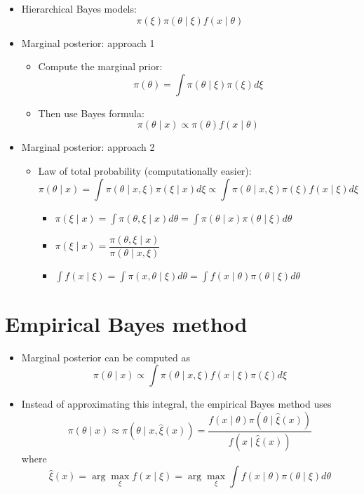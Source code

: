\documentclass[a4paper]{article}
\begin{document}
\begin{itemize}
    \item Hierarchical Bayes models:
    \[\pi(\xi)\pi(\theta\mid\xi)f(x\mid\theta) \]
    \item Marginal posterior: approach 1
    \begin{itemize}
        \item Compute the marginal prior:
        \[\pi(\theta)=\int\pi(\theta\mid\xi)\pi(\xi)d\xi \]
        \item Then use Bayes formula:
        \[\pi(\theta\mid x)\propto\pi(\theta)f(x\mid\theta) \]
    \end{itemize}
    \item Marginal posterior: approach 2
    \begin{itemize}
        \item Law of total probability (computationally easier):
        \[\pi(\theta\mid x)=\int\pi(\theta\mid x,\xi)\pi(\xi\mid x)d\xi\propto\int\pi(\theta\mid x,\xi)\pi(\xi)f(x\mid\xi)d\xi \]
        \begin{itemize}
            \item $\pi(\xi\mid x)=\int \pi(\theta,\xi\mid x)d\theta=\int\pi(\theta\mid x)\pi(\theta\mid\xi)d\theta$
            \item $\pi(\xi\mid x)=\dfrac{\pi(\theta,\xi\mid x)}{\pi(\theta\mid x,\xi)}$
            \item $\int f(x\mid\xi)=\int \pi(x,\theta\mid\xi)d\theta=\int f(x\mid\theta)\pi(\theta\mid\xi)d\theta$
        \end{itemize}
    \end{itemize}
\end{itemize}

\section*{Empirical Bayes method}

\begin{itemize}
    \item Marginal posterior can be computed as
    \[\pi(\theta\mid x)\propto\int\pi(\theta\mid x,\xi)f(x\mid\xi)\pi(\xi)d\xi \]
    \item Instead of approximating this integral, the empirical Bayes method uses
    \[\pi(\theta\mid x)\approx\pi(\theta\mid x,\hat{\xi}(x))=
    \frac{f(x\mid\theta)\pi(\theta\mid\hat{\xi}(x))}{f(x\mid\hat{\xi}(x))} \]
    where
    \[\hat{\xi}(x)=\arg\max_{\xi} f(x\mid\xi)=\arg\max_{\xi}\int f(x\mid\theta)\pi(\theta\mid\xi)d\theta \]
\end{itemize}
\end{document}
